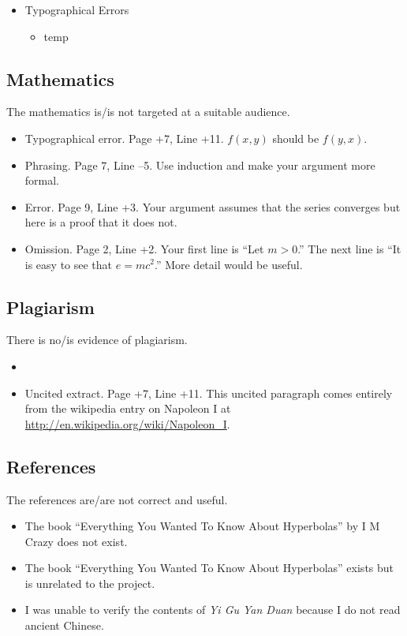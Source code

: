 \documentclass[11pt]{article}
\begin{document}
\begin{itemize}
	\item Typographical Errors
	\begin{itemize}
		\item temp
	\end{itemize}
\end{itemize}

\subsection*{Mathematics}

The mathematics is/is not targeted at a suitable audience.

\begin{itemize}
\item Typographical error. Page +7, Line +11. $f(x,y)$ should be $f(y,x)$.
\item Phrasing. Page 7, Line --5. Use induction and make your argument more formal.
\item Error. Page 9, Line +3. Your argument assumes that the series converges but here is a proof that it does not.
\item Omission. Page 2, Line +2. Your first line is ``Let $m > 0$.'' The next line is ``It is easy to see that $e = mc^2$.'' More detail would be useful.
\end{itemize}

\subsection*{Plagiarism}

There is no/is evidence of plagiarism.

\begin{itemize}
\item 
\item Uncited extract. Page +7, Line +11. This uncited paragraph comes entirely from the wikipedia entry on Napoleon I at \url{http://en.wikipedia.org/wiki/Napoleon_I}.
\end{itemize}

\subsection*{References}

The references are/are not correct and useful.

\begin{itemize}
\item The book ``Everything You Wanted To Know About Hyperbolas'' by I M Crazy does not exist.
\item The book ``Everything You Wanted To Know About Hyperbolas'' exists but is unrelated to the project.
\item I was unable to verify the contents of {\em Yi Gu Yan Duan} because I do not read ancient Chinese.
\end{itemize}
\end{document}
